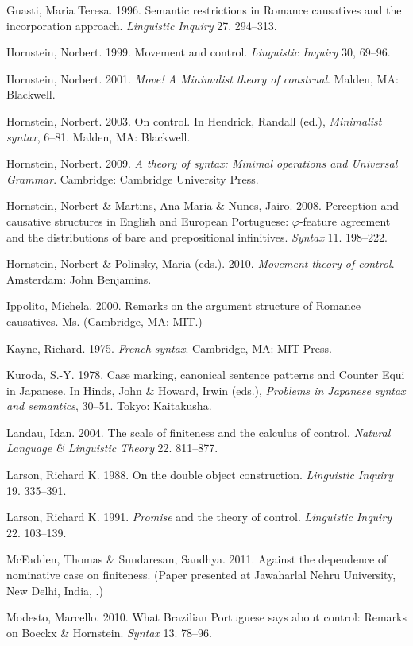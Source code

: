 \documentclass[output=paper]{langsci/langscibook}
\begin{document}
Guasti, Maria Teresa. 1996. Semantic restrictions in Romance causatives and the incorporation approach. \textit{Linguistic Inquiry} 27. 294–313. 

Hornstein, Norbert. 1999. Movement and control. \textit{Linguistic Inquiry} 30, 69–96. 

Hornstein, Norbert. 2001. \textit{Move! A Minimalist theory of construal}. Malden, MA: Blackwell. 

Hornstein, Norbert. 2003. On control. In Hendrick, Randall (ed.), \textit{Minimalist syntax}, 6–81. Malden, MA: Blackwell. 

Hornstein, Norbert. 2009. \textit{A theory of syntax: Minimal operations and Universal Grammar}. Cambridge: Cambridge University Press. 

Hornstein, Norbert \& Martins, Ana Maria \& Nunes, Jairo. 2008. Perception and causative structures in English and European Portuguese: $\varphi $-feature agreement and the distributions of bare and prepositional infinitives. \textit{Syntax} 11. 198–222.

Hornstein, Norbert \& Polinsky, Maria (eds.). 2010. \textit{Movement theory of control}. Amsterdam: John Benjamins.

Ippolito, Michela. 2000. Remarks on the argument structure of Romance causatives. Ms. (Cambridge, MA: MIT.)

Kayne, Richard. 1975. \textit{French syntax}. Cambridge, MA: MIT Press. 

Kuroda, S.-Y. 1978. Case marking, canonical sentence patterns and Counter Equi in Japanese. In Hinds, John \& Howard, Irwin (eds.), \textit{Problems in Japanese syntax and semantics}, 30–51. Tokyo: Kaitakusha.

Landau, Idan. 2004. The scale of finiteness and the calculus of control. \textit{Natural Language \& Linguistic Theory} 22. 811–877. 

Larson, Richard K. 1988. On the double object construction. \textit{Linguistic Inquiry} 19. 335–391. 

Larson, Richard K. 1991. \textit{Promise} and the theory of control. \textit{Linguistic Inquiry} 22. 103–139.

McFadden, Thomas \& Sundaresan, Sandhya. 2011. Against the dependence of nominative case on finiteness. (Paper presented at Jawaharlal Nehru University, New Delhi, India, \citealt{January2011}.)

Modesto, Marcello. 2010. What Brazilian Portuguese says about control: Remarks on Boeckx \& Hornstein. \textit{Syntax} 13. 78–96. 
\end{document}
